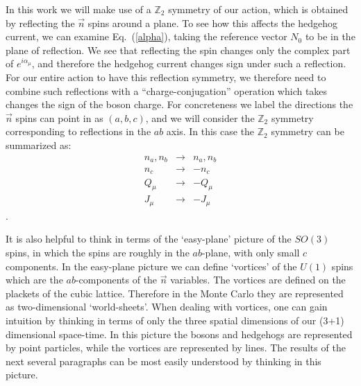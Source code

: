 \documentclass[prb,twocolumn]{revtex4-1}
\def\ztwo{\mathbb{Z}_2}
\begin{document}
In this work we will make use of a $\ztwo$ symmetry of our action, which is obtained by reflecting the $\vec{n}$ spins around a plane. To see how this affects the hedgehog current, we can examine Eq.~(\ref{alpha}), taking the reference vector $N_0$ to be in the plane of reflection. We see that reflecting the spin changes only the complex part of $e^{i\alpha_\mu}$, and therefore the hedgehog current changes sign under such a reflection. For our entire action to have this reflection symmetry, we therefore need to combine such reflections with a ``charge-conjugation'' operation which takes changes the sign of the boson charge. For concreteness we label the directions the $\vec n$ spins can point in as $(a,b,c)$, and we will consider the $\ztwo$ symmetry corresponding to reflections in the $ab$ axis. In this case the $\ztwo$ symmetry can be summarized as:
\begin{equation}
\begin{array}{ccc}
n_a,n_b & \rightarrow & n_a,n_b \\
n_c & \rightarrow & -n_c\\
Q_\mu & \rightarrow & -Q_\mu\\
J_\mu & \rightarrow & -J_\mu 
\end{array}
\end{equation}.

It is also helpful to think in terms of the `easy-plane' picture of the $SO(3)$ spins, in which the spins are roughly in the $ab$-plane, with only small $c$ components. In the easy-plane picture we can define `vortices' of the $U(1)$ spins which are the $ab$-components of the $\vec n$ variables. 
The vortices are defined on the plackets of the cubic lattice. Therefore in the Monte Carlo they are represented as two-dimensional `world-sheets'. When dealing with vortices, one can gain intuition by thinking in terms of only the three spatial dimensions of our (3+1) dimensional space-time. In this picture the bosons and hedgehogs are represented by point particles, while the vortices are represented by lines. The results of the next several paragraphs can be most easily understood by thinking in this picture.

\end{document}
